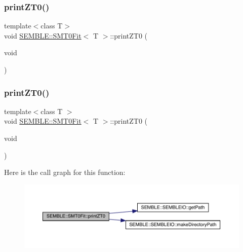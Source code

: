 \mbox{\label{structSEMBLE_1_1SMT0Fit_a3736fc1b96ef2088b5f1235b919010d7}} 
\subsubsection{\texorpdfstring{printZT0()}{printZT0()}\hspace{0.1cm}{\footnotesize\ttfamily [1/2]}}
{\footnotesize\ttfamily template$<$class T$>$ \\
void \mbox{\hyperlink{structSEMBLE_1_1SMT0Fit}{S\+E\+M\+B\+L\+E\+::\+S\+M\+T0\+Fit}}$<$ T $>$\+::print\+Z\+T0 (\begin{DoxyParamCaption}\item[{void}]{ }\end{DoxyParamCaption})}

\mbox{\label{structSEMBLE_1_1SMT0Fit_a3736fc1b96ef2088b5f1235b919010d7}} 
\subsubsection{\texorpdfstring{printZT0()}{printZT0()}\hspace{0.1cm}{\footnotesize\ttfamily [2/2]}}
{\footnotesize\ttfamily template$<$class T $>$ \\
void \mbox{\hyperlink{structSEMBLE_1_1SMT0Fit}{S\+E\+M\+B\+L\+E\+::\+S\+M\+T0\+Fit}}$<$ T $>$\+::print\+Z\+T0 (\begin{DoxyParamCaption}\item[{void}]{ }\end{DoxyParamCaption})}

Here is the call graph for this function\+:
\nopagebreak
\begin{figure}[H]
\begin{center}
\leavevmode
\includegraphics[width=350pt]{d6/dad/structSEMBLE_1_1SMT0Fit_a3736fc1b96ef2088b5f1235b919010d7_cgraph}
\end{center}
\end{figure}
\mbox{\label{structSEMBLE_1_1SMT0Fit_a503743e09b5c5f01d6b568dbd5d1ab5a}} 
